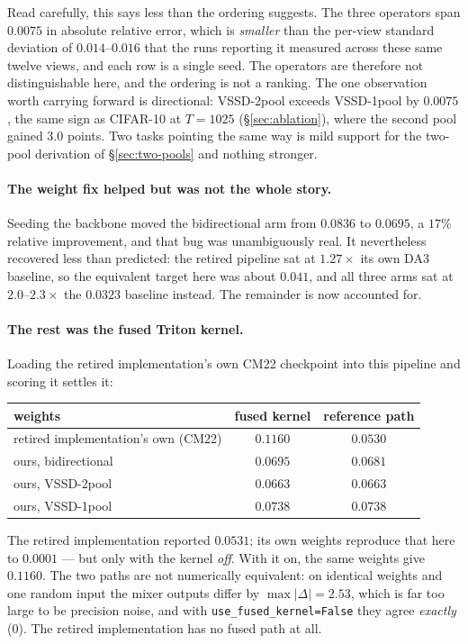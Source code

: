 \documentclass[11pt,a4paper]{article}
\begin{document}
\noindent Read carefully, this says less than the ordering suggests. The three operators span
$0.0075$ in absolute relative error, which is \emph{smaller} than the per-view standard
deviation of $0.014$--$0.016$ that the runs reporting it measured across these same twelve
views, and each row is a single seed. The operators are therefore not distinguishable here, and
the ordering is not a ranking. The one observation worth carrying forward is directional:
VSSD-2pool exceeds VSSD-1pool by $0.0075$, the same sign as CIFAR-10 at
$T{=}1025$ (\S\ref{sec:ablation}), where the second pool gained $3.0$ points. Two tasks
pointing the same way is mild support for the two-pool derivation of \S\ref{sec:two-pools} and
nothing stronger.

\paragraph{The weight fix helped but was not the whole story.} Seeding the backbone moved the
bidirectional arm from $0.0836$ to $0.0695$, a $17\%$ relative improvement, and that bug was
unambiguously real. It nevertheless recovered less than predicted: the retired pipeline sat at
$1.27\times$ its own DA3 baseline, so the equivalent target here was about $0.041$, and all three
arms sat at $2.0$--$2.3\times$ the $0.0323$ baseline instead. The remainder is now accounted for.

\paragraph{The rest was the fused Triton kernel.} Loading the retired implementation's own CM22
checkpoint into this pipeline and scoring it settles it:
\begin{center}\small
\begin{tabular}{lcc}
\toprule
weights & fused kernel & reference path \\
\midrule
retired implementation's own (CM22) & $0.1160$ & $\mathbf{0.0530}$ \\
ours, bidirectional                 & $0.0695$ & $0.0681$ \\
ours, VSSD-2pool           & $0.0663$ & $0.0663$ \\
ours, VSSD-1pool                 & $0.0738$ & $0.0738$ \\
\bottomrule
\end{tabular}
\end{center}
\noindent The retired implementation reported $0.0531$; its own weights reproduce that here to
$0.0001$ --- but only with the kernel \emph{off}. With it on, the same weights give $0.1160$. The
two paths are not numerically equivalent: on identical weights and one random input the mixer
outputs differ by $\max|\Delta| = 2.53$, which is far too large to be precision noise, and with
\texttt{use\_fused\_kernel=False} they agree \emph{exactly} ($0$). The retired implementation has
no fused path at all.
\end{document}
